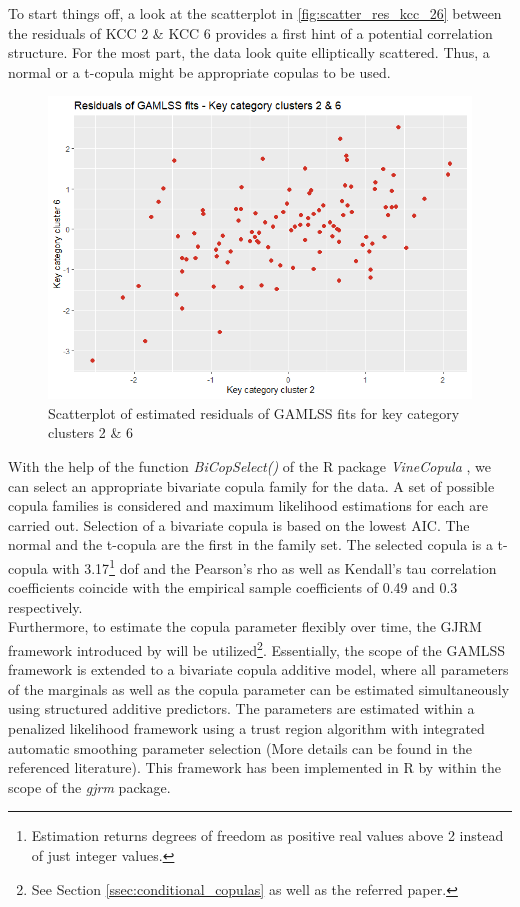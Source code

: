 
To start things off, a look at the scatterplot in \autoref{fig:scatter_res_kcc_26} between the residuals of \ac{KCC} 2 \& \ac{KCC} 6 provides a first hint of a potential correlation structure. For the most part, the data look quite elliptically scattered. Thus, a normal or a t-copula might be appropriate copulas to be used.
\\


\begin{figure}[H]
\centering
  \includegraphics[width=0.45\linewidth]{figures/scatter_res_kcc_26.png}
  \caption{Scatterplot of estimated residuals of GAMLSS fits for key category clusters 2 \& 6}
  \label{fig:scatter_res_kcc_26}
\end{figure}

With the help of the function \textit{BiCopSelect()} of the R package \textit{VineCopula} \citep{nagler2019vinecopula}, we can select an appropriate bivariate copula family for the data. A set of possible copula families is considered and maximum likelihood estimations for each are carried out. Selection of a bivariate copula is based on the lowest \ac{AIC}. The normal and the t-copula are the first in the family set. The selected copula is a t-copula with 3.17\footnote{Estimation returns degrees of freedom as positive real values above 2 instead of just integer values.} \ac{dof} and the Pearson's rho as well as Kendall's tau correlation coefficients coincide with the empirical sample coefficients of 0.49 and 0.3 respectively.
\\

Furthermore, to estimate the copula parameter flexibly over time, the \ac{GJRM} framework introduced by \cite{marra1605bivariate} will be utilized\footnote{See Section \ref{ssec:conditional_copulas} as well as the referred paper.}. Essentially, the scope of the \ac{GAMLSS} framework is extended to a bivariate copula additive model, where all parameters of the marginals as well as the copula parameter can be estimated simultaneously using structured additive predictors. The parameters are estimated within a penalized likelihood framework using a trust region algorithm with integrated automatic smoothing parameter selection (More details can be found in the referenced literature). This framework has been implemented in R by \cite{marragjrm} within the scope of the \textit{gjrm} package. \\

